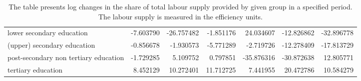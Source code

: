 \documentclass{article}
\begin{document}
\begin{table}[!htbp]
\begin{center}
{\begin{tabular}{lrrrrrr}
lower secondary education             &  -7.603790 & -26.757482 &  -1.851176 &  24.034607 &  -12.826862 & -32.896778 \\
(upper) secondary education           &  -0.856678 &  -1.930573 &  -5.771289 &  -2.719726 &  -12.278409 & -17.813729 \\
post-secondary non tertiary education &  -1.729285 &   5.109752 &   0.797851 & -35.876316 &  -30.872638 &  12.805771 \\
tertiary education                    &   8.452129 &  10.272401 &  11.712725 &   7.441955 &   20.472786 &  10.584279 \\
\bottomrule
\end{tabular}

}
\caption*{ \footnotesize The table presents log changes in the share of total labour supply provided by given group in a specified period. The labour supply is measured in the efficiency units.}
\end{center}
\end{table}
\end{document}
